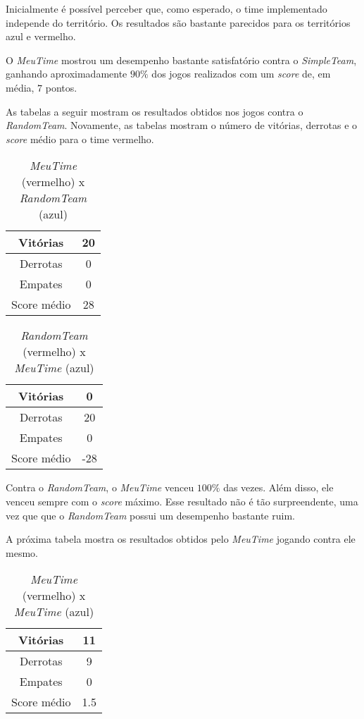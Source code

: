 \documentclass[a4paper,12pt]{article}
\begin{document}
Inicialmente é possível perceber que, como esperado, o time implementado independe do
território. Os resultados são bastante parecidos para os territórios azul e vermelho.

O \textit{MeuTime} mostrou um desempenho bastante satisfatório contra o \textit{SimpleTeam},
ganhando aproximadamente $90\%$ dos jogos realizados com um \textit{score} de, em média,
$7$ pontos.

As tabelas a seguir mostram os resultados obtidos nos jogos contra o \textit{RandomTeam}.
Novamente, as tabelas mostram o número de vitórias, derrotas e o \textit{score} médio
para o time vermelho.

\begin{table}[htb!]
    {\centering
    \begin{tabular}{|c|c|} \hline
    Vitórias     & 20 \\ \hline
    Derrotas     & 0  \\ \hline
    Empates      & 0  \\ \hline
    Score médio  & 28 \\ \hline
    \end{tabular}
    \caption{\textit{MeuTime} (vermelho) x \textit{RandomTeam} (azul)}
    }
\end{table}

\begin{table}[htb!]
    {\centering
    \begin{tabular}{|c|c|} \hline
    Vitórias     & 0   \\ \hline
    Derrotas     & 20  \\ \hline
    Empates      & 0   \\ \hline
    Score médio  & -28 \\ \hline
    \end{tabular}
    \caption{\textit{RandomTeam} (vermelho) x \textit{MeuTime} (azul)}
    }
\end{table}

Contra o \textit{RandomTeam}, o \textit{MeuTime} venceu $100\%$ das vezes. Além disso,
ele venceu sempre com o \textit{score} máximo. Esse resultado não é tão surpreendente,
uma vez que que o \textit{RandomTeam} possui um desempenho bastante ruim.

A próxima tabela mostra os resultados obtidos pelo \textit{MeuTime} jogando contra
ele mesmo.

\begin{table}[htb!]
    {\centering
    \begin{tabular}{|c|c|} \hline
    Vitórias     & 11  \\ \hline
    Derrotas     & 9   \\ \hline
    Empates      & 0   \\ \hline
    Score médio  & 1.5 \\ \hline
    \end{tabular}
    \caption{\textit{MeuTime} (vermelho) x \textit{MeuTime} (azul)}
    }
\end{table}
\end{document}
